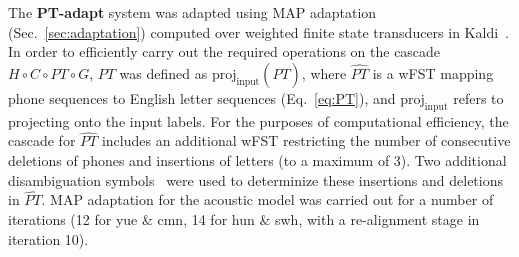 \label{sec:ptadapt}

{\color{blue} The {\bf PT-adapt} system was
  adapted using MAP adaptation (Sec.~\ref{sec:adaptation})
  computed over weighted finite state transducers in }
Kaldi~\cite{Kaldi2011}. In order to efficiently carry out the required
operations on the cascade $H\circ C\circ PT\circ G$, $PT$ was defined
as $\mathrm{proj}_{\mathrm{input}} (\widehat{PT})$, where
$\widehat{PT}$ is a wFST mapping phone sequences to English letter
sequences (Eq.~\ref{eq:PT}), and $\mathrm{proj}_{\mathrm{input}}$
refers to projecting onto the input labels. For the purposes of
computational efficiency, the cascade for $\widehat{PT}$ includes an
additional wFST restricting the number of consecutive deletions of
phones and insertions of letters (to a maximum of 3). Two additional
disambiguation symbols~\cite{mohri2008speech} were used to determinize
these insertions and deletions in $\widehat{PT}$. MAP adaptation for
the acoustic model was carried out for a number of iterations (12 for
yue \& cmn, 14 for hun \& swh, with a re-alignment stage in iteration
10).
